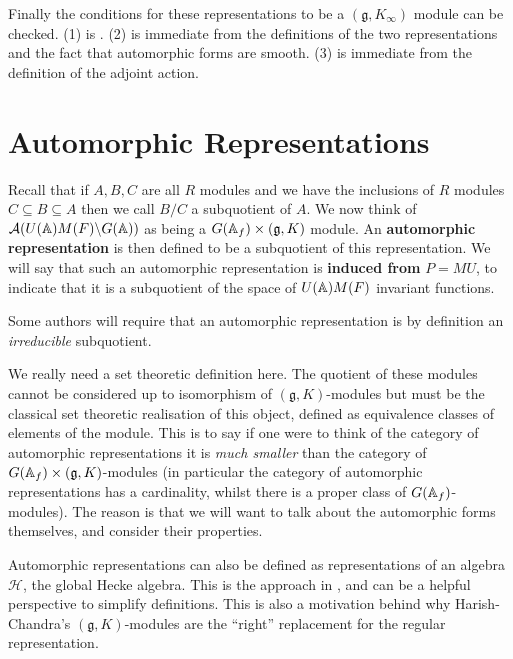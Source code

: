 Finally the conditions for these representations to be a \((\mathfrak{g}, K_\infty)\) module can be checked. (1) is \cite[Thm. 6.3.4]{getzIntroductionAutomorphicRepresentations2024}. (2) is immediate from the definitions of the two representations and the fact that automorphic forms are smooth. (3) is immediate from the definition of the adjoint action.


\section{Automorphic Representations}
Recall that if \(A, B, C\) are all \(R\) modules and we have the inclusions of \(R\) modules \(C \subseteq B \subseteq A\) then we call \(B/C\) a subquotient of \(A\). We now think of \(\mathcal{A}(U(\A)M(F)\backslash G(\A))\) as being a \(G(\A_f)\times (\mathfrak{g}, K)\) module. An \textbf{automorphic representation} is then defined to be a subquotient of this representation. We will say that such an automorphic representation is \textbf{induced from }\(P = MU\), to indicate that it is a subquotient of the space of \(U(\A)M(F)\) invariant functions.\label{induced}
\begin{remark}
    Some authors will require that an automorphic representation is by definition an \textit{irreducible} subquotient.
\end{remark}
\begin{remark}
    We really need a set theoretic definition here. The quotient of these modules cannot be considered up to isomorphism of \((\mathfrak{g}, K)\)-modules but must be the classical set theoretic realisation of this object, defined as equivalence classes of elements of the module. This is to say if one were to think of the category of automorphic representations it is \textit{much smaller} than the category of \(G(\A_f)\times (\mathfrak{g}, K)\)-modules (in particular the category of automorphic representations has a cardinality, whilst there is a proper class of \(G(\A_f)\)-modules). The reason is that we will want to talk about the automorphic forms themselves, and consider their properties.
\end{remark}

\begin{remark}
    Automorphic representations can also be defined as representations of an algebra \(\mathcal{H}\), the global Hecke algebra. This is the approach in \cite[I.II(4.6)]{borelAutomorphicFormsRepresentations1979}, and can be a helpful perspective to simplify definitions. This is also a motivation behind why Harish-Chandra's \((\mathfrak{g}, K)\)-modules are the ``right'' replacement for the regular representation. 
\end{remark}

